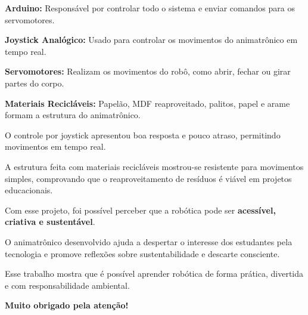 \documentclass[12pt]{article}
\begin{document}
\begin{tcolorbox}[colback=orange!5,colframe=laranja,title=\textbf{Componentes Utilizados}]
\textbf{Arduino:} Responsável por controlar todo o sistema e enviar comandos para os servomotores.

\textbf{Joystick Analógico:} Usado para controlar os movimentos do animatrônico em tempo real.

\textbf{Servomotores:} Realizam os movimentos do robô, como abrir, fechar ou girar partes do corpo.

\textbf{Materiais Recicláveis:} Papelão, MDF reaproveitado, palitos, papel e arame formam a estrutura do animatrônico.
\end{tcolorbox}

\begin{tcolorbox}[colback=blue!5,colframe=azul,title=\textbf{Resultados}]
O controle por joystick apresentou boa resposta e pouco atraso, permitindo movimentos em tempo real.

A estrutura feita com materiais recicláveis mostrou-se resistente para movimentos simples, comprovando que o reaproveitamento de resíduos é viável em projetos educacionais.
\end{tcolorbox}

\begin{tcolorbox}[colback=green!5,colframe=verde,title=\textbf{Conclusão}]
Com esse projeto, foi possível perceber que a robótica pode ser \textbf{acessível, criativa e sustentável}.

O animatrônico desenvolvido ajuda a despertar o interesse dos estudantes pela tecnologia e promove reflexões sobre sustentabilidade e descarte consciente.

Esse trabalho mostra que é possível aprender robótica de forma prática, divertida e com responsabilidade ambiental.

\textbf{Muito obrigado pela atenção!}
\end{tcolorbox}
\end{document}
